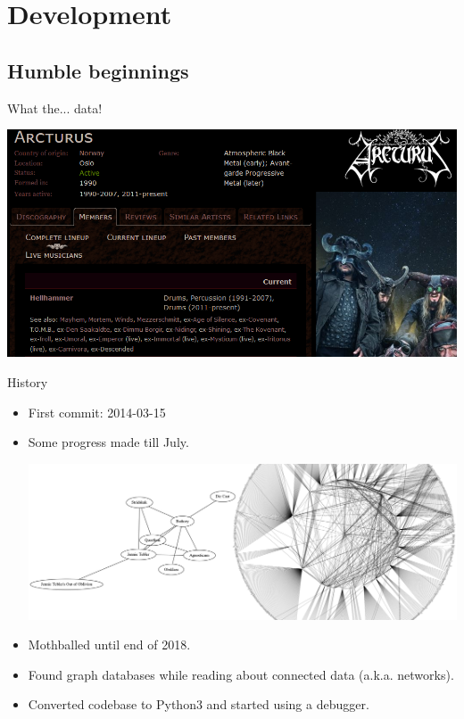 \documentclass{beamer}
\begin{document}
\section{Development}

  \subsection{Humble beginnings}

    \begin{frame}{What the... data!}
    
      \begin{center}
        \includegraphics[scale=.55]{MA_Arcturus}
      \end{center}
    
    \end{frame}

    \begin{frame}{History}

      \begin{itemize}

        \item<1-> First commit: 2014-03-15
        \item<1-> Some progress made till July.
          \begin{center}
            \includegraphics[scale=.6]{bandsGraphCombined}
          \end{center}
        \item<2-> Mothballed until end of 2018.
        \item<2-> Found graph databases while reading about connected data
          (a.k.a. networks).
        \item<2-> Converted codebase to Python3 and started using a debugger.
      \end{itemize}

    \end{frame}
    
\end{document}
